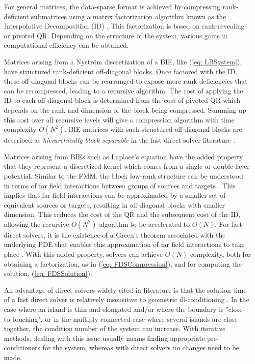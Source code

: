 \documentclass{sfuthesis}
\begin{document}
For general matrices, the data-sparse format is achieved by compressing rank-deficient submatrices using a matrix factorization algorithm known as the Interpolative Decomposition (ID) \cite{ChengEtAl2005}. This factorization is based on rank-revealing or pivoted QR. Depending on the structure of the system, various gains in computational efficiency can be obtained. 

Matrices arising from a Nystr\"{o}m discretization of a BIE, like (\ref{eq: LBSystem}), have structured rank-deficient off-diagonal blocks. Once factored with the ID, these off-diagonal blocks can be rearranged to expose more rank deficiencies that can be recompressed, leading to a recursive algorithm. The cost of applying the ID to each off-diagonal block is determined from the cost of pivoted QR which depends on the rank and dimension of the block being compressed. Summing up this cost over all recursive levels will give a compression algorithm with time complexity $O(N^2)$. BIE matrices with such structured off-diagonal blocks are described as \textit{hierarchically block separable} in the fast direct solver literature \cite{GillYoungMart2012, HoGreen2012}. 

Matrices arising from BIEs such as Laplace's equation have the added property that they represent a discretized kernel which comes from a single or double layer potential. Similar to the FMM, the block low-rank structure can be understood in terms of far field interactions between groups of sources and targets \cite{HoGreen2012}. This implies that far field interactions can be approximated by a smaller set of equivalent sources or targets, resulting in off-diagonal blocks with smaller dimension. This reduces the cost of the QR and the subsequent cost of the ID, allowing the recursive $O(N^2)$ algorithm to be accelerated to $O(N)$. For fast direct solvers, it is the existence of a Green's theorem associated with the underlying PDE that enables this approximation of far field interactions to take place \cite{MartRokh2005, HoGreen2012}. With this added property, solvers can achieve $O(N)$ complexity, both for obtaining a factorization, as in (\ref{eq: FDSCompression}), and for computing the solution, (\ref{eq: FDSSolution}).

An advantage of direct solvers widely cited in literature is that the solution time of a fast direct solver is relatively insensitive to geometric ill-conditioning \cite{MartRokh2005, GillYoungMart2012, HoGreen2012}. In the case where an island is thin and elongated and/or where the boundary is "close-to-touching", or in the multiply connected case where several islands are close together, the condition number of the system can increase. With iterative methods, dealing with this issue usually means finding appropriate pre-conditioners for the system, whereas with direct solvers no changes need to be made.  
\end{document}
